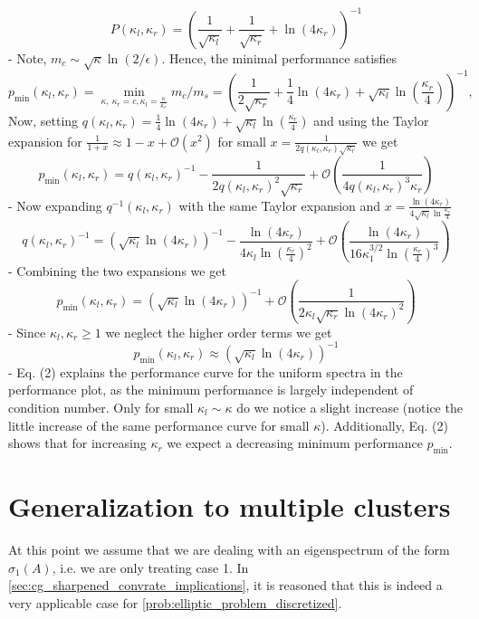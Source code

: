 \begin{equation}
    P(\kappa_l, \kappa_r) = \left(\frac{1}{\sqrt{\kappa_l}} + \frac{1}{\sqrt{\kappa_r}} + \ln(4\kappa_r)\right)^{-1}
\end{equation}
- Note, $m_c \sim \sqrt{\kappa}\ln(2/\epsilon)$. Hence, the minimal performance satisfies
\[
p_{\text{min}}(\kappa_l, \kappa_r) = \min_{\kappa, \ \kappa_r=c, \kappa_l = \frac{\kappa}{\kappa_r}} m_c/m_s = \left(\frac{1}{2\sqrt{\kappa_r}} + \frac{1}{4}\ln(4\kappa_r) + \sqrt{\kappa_l}\ln\left(\frac{\kappa_r}{4}\right)\right)^{-1},
\]
Now, setting $q(\kappa_l,\kappa_r) = \frac{1}{4}\ln(4\kappa_r) + \sqrt{\kappa_l}\ln\left(\frac{\kappa_r}{4}\right)$ and using the Taylor expansion for $\frac{1}{1 + x} \approx 1 - x + \mathcal{O}(x^2)$ for small $x = \frac{1}{2q(\kappa_l,\kappa_r)\sqrt{\kappa_r}}$ we get
\[
p_{\text{min}}(\kappa_l, \kappa_r) = q(\kappa_l,\kappa_r)^{-1} - \frac{1}{2q(\kappa_l,\kappa_r)^2\sqrt{\kappa_r}} + \mathcal{O}\left(\frac{1}{4q(\kappa_l,\kappa_r)^3\kappa_r}\right)
\]
- Now expanding $q^{-1}(\kappa_l,\kappa_r)$ with the same Taylor expansion and $x=\frac{\ln(4\kappa_r)}{4\sqrt{\kappa_l}\ln\frac{\kappa_r}{4}}$
\[
q(\kappa_l,\kappa_r)^{-1} = (\sqrt{\kappa_l}\ln(4\kappa_r))^{-1} - \frac{\ln(4\kappa_r)}{4\kappa_l\ln(\frac{\kappa_r}{4})^2} + \mathcal{O}\left(\frac{\ln(4\kappa_r)}{16\kappa^{3/2}_1\ln(\frac{\kappa_r}{4})^3}\right)
\]
- Combining the two expansions we get
\[
p_{\text{min}}(\kappa_l, \kappa_r) = (\sqrt{\kappa_l}\ln(4\kappa_r))^{-1} + \mathcal{O}\left(\frac{1}{2\kappa_l\sqrt{\kappa_r}\ln(4\kappa_r)^2}\right)
\]
- Since $\kappa_l,\kappa_r \geq 1$ we neglect the higher order terms  we get
\[
p_{\text{min}}(\kappa_l, \kappa_r) \approx (\sqrt{\kappa_l}\ln(4\kappa_r))^{-1} \tag{2}
\]
- Eq. (2) explains the performance curve for the uniform spectra in the performance plot, as the minimum performance is largely independent of condition number. Only for small $\kappa_l \sim \kappa$ do we notice a slight increase (notice the little increase of the same performance curve for small $\kappa$). Additionally, Eq. (2) shows that for increasing $\kappa_r$ we expect a decreasing minimum performance $p_{\text{min}}$.

\section{Generalization to multiple clusters}\label{sec:multiple_clusters}
At this point we assume that we are dealing with an eigenspectrum of the form $\sigma_1(A)$, i.e. we are only treating case 1. In \cref{sec:cg_sharpened_convrate_implications}, it is reasoned that this is indeed a very applicable case for \cref{prob:elliptic_problem_discretized}.

